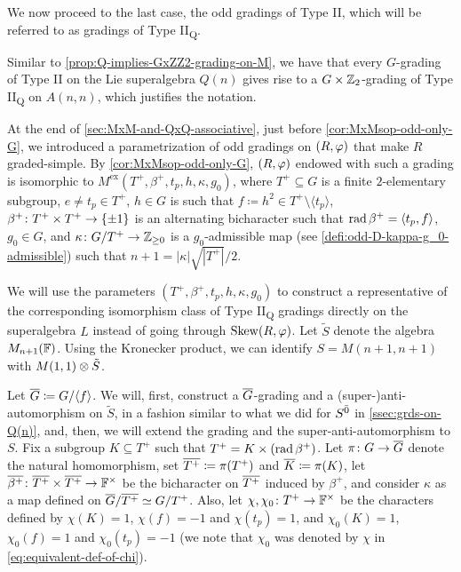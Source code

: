 
We now proceed to the last case, the odd gradings of Type II, which will be referred to as gradings of Type II\textsubscript{Q}. 

\begin{remark}\label{prop:Q-implies-GxZZ2-grading-on-M-II}
    Similar to \cref{prop:Q-implies-GxZZ2-grading-on-M}, we have that
    every $G$-grading of Type II on the Lie superalgebra $Q(n)$ gives rise to a $G\times \mathbb{Z}_2$-grading of Type II\textsubscript{Q} on $A(n,n)$, which justifies the notation.  
\end{remark}

At the end of \cref{sec:MxM-and-QxQ-associative}, just before \cref{cor:MxMsop-odd-only-G}, we introduced a parametrization of odd gradings on $(R, \varphi)$ that make $R$ graded-simple. 
By \cref{cor:MxMsop-odd-only-G}, $(R, \varphi)$ endowed with such a grading is isomorphic to $M^{\mathrm{ex}}(T^+, \beta^+, t_p, h, \kappa, g_0)$, where $T^+ \subseteq G$ is a finite $2$-elementary subgroup, $e\neq t_p \in T^+$, $h \in G$ is such that $f \coloneqq h^2 \in T^+ \setminus \langle t_p \rangle$, $\beta^+\colon T^+ \times T^+ \to \{ \pm 1 \}$ is an alternating bicharacter such that $\operatorname{rad} \beta^+ = \langle t_p, f \rangle$, $g_0\in G$, and $\kappa\colon G/T^+ \to \mathbb{Z}_{\geq 0}$ is a $g_0$-admissible map (see \cref{defi:odd-D-kappa-g_0-admissible}) such that $n+1 = |\kappa| \sqrt{|T^+|}/2$. 

We will use the parameters $(T^+, \beta^+, t_p, h, \kappa, g_0)$ to construct a representative of the corresponding isomorphism class of Type II\textsubscript{Q} gradings directly on the superalgebra $L$ instead of going through $\operatorname{Skew}(R, \varphi)$. 
Let $\tilde S$ denote the algebra $M_{n+1}(\mathbb{F})$. 
Using the Kronecker product, we can identify $S = M(n+1, n+1)$ with $M(1, 1) \otimes \tilde S$.

Let $\barr G \coloneqq G/\langle f \rangle$. 
We will, first, construct a $\barr G$-grading and a (super-)anti-automorphism on $\tilde S$, in a fashion similar to what we did for $S^{\bar0}$ in \cref{ssec:grds-on-Q(n)}, and, then, we will extend the grading and the super-anti-automorphism to $S$. 
Fix a subgroup $K \subseteq T^+$ such that $T^+ = K \times (\operatorname{rad} \beta^+)$. 
Let $\pi\from G \to \barr G$ denote the natural homomorphism, set $\barr {T^+} \coloneqq \pi(T^+)$ and $\barr {K} \coloneqq \pi(K)$, let $\barr {\beta^+}\from \barr {T^+} \times \barr {T^+} \to \FF^\times$ be the bicharacter on $\barr {T^+}$ induced by $\beta^+$, and consider $\kappa$ as a map defined on $\barr G/\barr {T^+} \iso G/{T^+}$. 
Also, let $\chi,\chi_0 \colon T^+ \to \mathbb{F}^\times$ be the characters defined by $\chi(K) = 1$, $\chi(f) = -1$ and $\chi(t_p) = 1$, and $\chi_0(K) = 1$, $\chi_0(f) = 1$ and $\chi_0(t_p) = -1$ (we note that $\chi_0$ was denoted by $\chi$ in \cref{eq:equivalent-def-of-chi}). 

